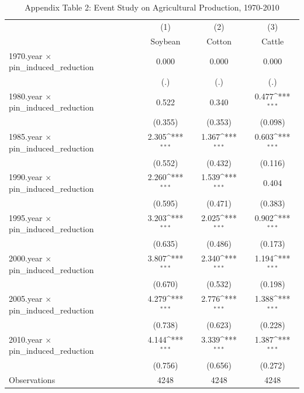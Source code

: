 \begin{table}[h]\centering
\def\sym#1{\ifmmode^{#1}\else\(^{#1}\)\fi}
\renewcommand{\arraystretch}{1.3}
\caption*{Appendix Table 2: Event Study on Agricultural Production, 1970-2010}
\begin{tabular}{l*{3}{c}}
\hline\hline
                    &\multicolumn{1}{c}{(1)}         &\multicolumn{1}{c}{(2)}         &\multicolumn{1}{c}{(3)}         \\
                    &     Soybean         &      Cotton         &      Cattle         \\
\hline
1970.year $\times$ pin\_induced\_reduction&       0.000         &       0.000         &       0.000         \\
                    &         (.)         &         (.)         &         (.)         \\
1980.year $\times$ pin\_induced\_reduction&       0.522         &       0.340         &       0.477\sym{***}\\
                    &     (0.355)         &     (0.353)         &     (0.098)         \\
1985.year $\times$ pin\_induced\_reduction&       2.305\sym{***}&       1.367\sym{***}&       0.603\sym{***}\\
                    &     (0.552)         &     (0.432)         &     (0.116)         \\
1990.year $\times$ pin\_induced\_reduction&       2.260\sym{***}&       1.539\sym{***}&       0.404         \\
                    &     (0.595)         &     (0.471)         &     (0.383)         \\
1995.year $\times$ pin\_induced\_reduction&       3.203\sym{***}&       2.025\sym{***}&       0.902\sym{***}\\
                    &     (0.635)         &     (0.486)         &     (0.173)         \\
2000.year $\times$ pin\_induced\_reduction&       3.807\sym{***}&       2.340\sym{***}&       1.194\sym{***}\\
                    &     (0.670)         &     (0.532)         &     (0.198)         \\
2005.year $\times$ pin\_induced\_reduction&       4.279\sym{***}&       2.776\sym{***}&       1.388\sym{***}\\
                    &     (0.738)         &     (0.623)         &     (0.228)         \\
2010.year $\times$ pin\_induced\_reduction&       4.144\sym{***}&       3.339\sym{***}&       1.387\sym{***}\\
                    &     (0.756)         &     (0.656)         &     (0.272)         \\
\hline
Observations        &        4248         &        4248         &        4248         \\
\hline\hline
\end{tabular}
\end{table}
